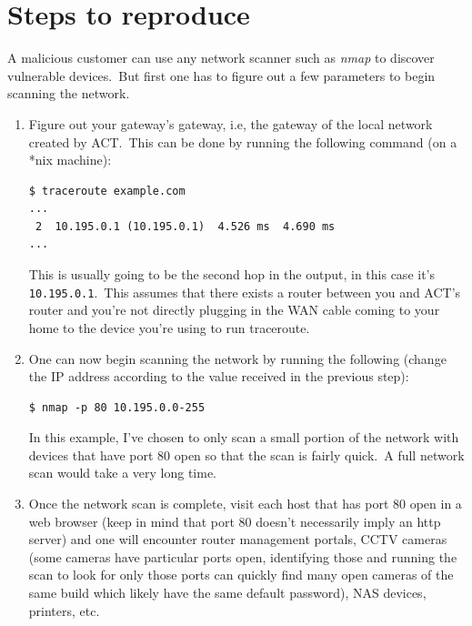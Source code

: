 \documentclass[11pt]{article}
\begin{document}
    \section{Steps to reproduce}\label{sec:steps-to-reproduce}
    A malicious customer can use any network scanner such as \emph{nmap} to discover vulnerable devices.\ But first
    one has to figure out a few parameters to begin scanning the network.
    \begin{enumerate}[leftmargin=*]
        \item Figure out your gateway's gateway, i.e, the gateway of the local network created by ACT.\ This can be done
        by running the following command (on a *nix machine):
        \begin{verbatim}
$ traceroute example.com
...
 2  10.195.0.1 (10.195.0.1)  4.526 ms  4.690 ms
...
        \end{verbatim}
        This is usually going to be the second hop in the output, in this case it's \texttt{10.195.0.1}.\ This assumes
        that there exists a router between you and ACT's router and you're not directly plugging in the WAN cable coming
        to your home to the device you're using to run traceroute.

        \item One can now begin scanning the network by running the following (change the IP address according to
        the value received in the previous step):
        \begin{verbatim}
$ nmap -p 80 10.195.0.0-255
        \end{verbatim}
        In this example, I've chosen to only scan a small portion of the network with devices that have port 80 open
        so that the scan is fairly quick.\ A full network scan would take a very long time.

        \item Once the network scan is complete, visit each host that has port 80 open in a web browser (keep in mind
        that port 80 doesn't necessarily imply an http server) and one will encounter router management portals, CCTV
        cameras (some cameras have particular ports open, identifying those and running the scan to look for only
        those ports can quickly find many open cameras of the same build which likely have the same default password),
        NAS devices, printers, etc.\
    \end{enumerate}
\end{document}
